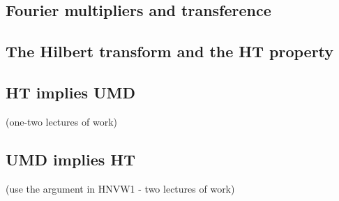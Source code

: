 
\subsection{Fourier multipliers and transference}

\subsection{The Hilbert transform and the HT property}

\subsection{HT implies UMD}

(one-two lectures of work)

\subsection{UMD implies HT}

(use the argument in HNVW1 - two lectures of work)



